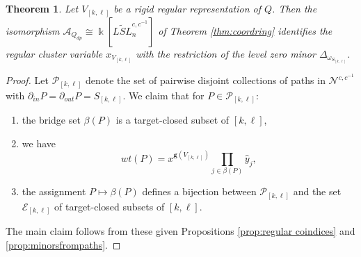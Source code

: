 \documentclass[12pt]{amsart}
\newcommand{\sayDR}[1]{\say[DR]{\color{red}{\bf DR:}\;#1}}
\newcommand{\cA}{\mathcal{A}}
\newcommand{\ZZ}{\mathbb{Z}}
\newcommand{\kk}{\Bbbk}%
\newcommand{\bfg}{\mathbf{g}}
\newcommand{\cE}{\mathcal{E}}
\newcommand{\cN}{\mathcal{N}} %
\newcommand{\cP}{\mathcal{P}}
\newcommand{\Qdp}{Q_{dp}}
\newtheorem{theorem}{Theorem}[section]
\theoremstyle{remark}
\numberwithin{equation}{section}
\numberwithin{figure}{section}
\begin{document}
\begin{theorem}\label{th:cluster character equals minor}
Let $V_{[k,\ell]}$ be a rigid regular representation of $Q$. Then the isomorphism $\cA_{\Qdp} \cong \kk[\widetilde{LSL}_n^{c,c^{-1}}]$ of Theorem \ref{thm:coordring} identifies the regular cluster variable $x_{V_{[k,\ell]}}$ with the restriction of the level zero minor $\Delta_{\omega_{S_{[k,\ell]}}}$. 
\end{theorem}
\begin{proof}
Let $\cP_{[k,\ell]}$ denote the set of pairwise disjoint collections of paths in $\cN^{c,c^{-1}}$ with $\partial_{in}P = \partial_{out}P = S_{[k,\ell]}$. 
We claim that for $P \in \cP_{[k,\ell]}$: 
\begin{enumerate}
\item the bridge set $\beta(P)$ is a target-closed subset of $[k,\ell]$, 
\item we have
\[
wt(P) = x^{\bfg(V_{[k,\ell]})} \prod_{j \in \beta(P)} \hat{y}_j,
\]
\item 
the assignment $P \mapsto \beta(P)$ defines a bijection between $\cP_{[k,\ell]}$ and the set $\cE_{[k,\ell]}$ of target-closed subsets of $[k,\ell]$.
\end{enumerate}
The main claim follows from these given Propositions \ref{prop:regular coindices} and \ref{prop:minorsfrompaths}.




\end{proof}
\end{document}
